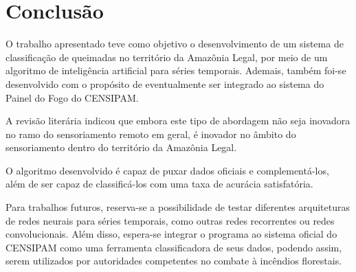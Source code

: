 \chapter{Conclusão}
\label{conclusao}

O trabalho apresentado teve como objetivo o desenvolvimento de um sistema de classificação de queimadas no território da Amazônia Legal, por meio de um algoritmo de inteligência artificial para séries temporais. Ademais, também foi-se desenvolvido com o propósito de eventualmente ser integrado ao sistema do Painel do Fogo do CENSIPAM.

A revisão literária indicou que embora este tipo de abordagem não seja inovadora no ramo do sensoriamento remoto em geral, é inovador no âmbito do sensoriamento dentro do território da Amazônia Legal.

O algoritmo desenvolvido é capaz de puxar dados oficiais e complementá-los, além de ser capaz de classificá-los com uma taxa de acurácia satisfatória.

Para trabalhos futuros, reserva-se a possibilidade de testar diferentes arquiteturas de redes neurais para séries temporais, como outras redes recorrentes ou redes convolucionais. Além disso, espera-se integrar o programa ao sistema oficial do CENSIPAM como uma ferramenta classificadora de seus dados, podendo assim, serem utilizados por autoridades competentes no combate à incêndios florestais.






